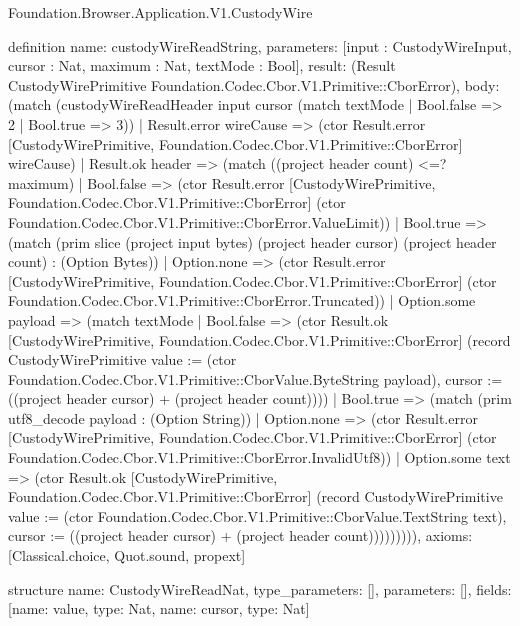 \begin{lexlean}{Foundation.Browser.Application.V1.CustodyWire}
\begin{semanticmodule}
definition{
  name: custodyWireReadString,
  parameters: [input : CustodyWireInput, cursor : Nat, maximum : Nat, textMode : Bool],
  result: (Result CustodyWirePrimitive Foundation.Codec.Cbor.V1.Primitive::CborError),
  body: (match (custodyWireReadHeader input cursor (match textMode
      | Bool.false => 2
      | Bool.true => 3))
    | Result.error wireCause => (ctor Result.error [CustodyWirePrimitive, Foundation.Codec.Cbor.V1.Primitive::CborError] wireCause)
    | Result.ok header => (match ((project header count) <=? maximum)
      | Bool.false => (ctor Result.error [CustodyWirePrimitive, Foundation.Codec.Cbor.V1.Primitive::CborError] (ctor Foundation.Codec.Cbor.V1.Primitive::CborError.ValueLimit))
      | Bool.true => (match (prim slice (project input bytes) (project header cursor) (project header count) : (Option Bytes))
        | Option.none => (ctor Result.error [CustodyWirePrimitive, Foundation.Codec.Cbor.V1.Primitive::CborError] (ctor Foundation.Codec.Cbor.V1.Primitive::CborError.Truncated))
        | Option.some payload => (match textMode
          | Bool.false => (ctor Result.ok [CustodyWirePrimitive, Foundation.Codec.Cbor.V1.Primitive::CborError] (record CustodyWirePrimitive {value := (ctor Foundation.Codec.Cbor.V1.Primitive::CborValue.ByteString payload), cursor := ((project header cursor) + (project header count))}))
          | Bool.true => (match (prim utf8_decode payload : (Option String))
            | Option.none => (ctor Result.error [CustodyWirePrimitive, Foundation.Codec.Cbor.V1.Primitive::CborError] (ctor Foundation.Codec.Cbor.V1.Primitive::CborError.InvalidUtf8))
            | Option.some text => (ctor Result.ok [CustodyWirePrimitive, Foundation.Codec.Cbor.V1.Primitive::CborError] (record CustodyWirePrimitive {value := (ctor Foundation.Codec.Cbor.V1.Primitive::CborValue.TextString text), cursor := ((project header cursor) + (project header count))}))))))),
  axioms: [Classical.choice, Quot.sound, propext]
}

structure{
  name: CustodyWireReadNat,
  type_parameters: [],
  parameters: [],
  fields: [{name: value, type: Nat}, {name: cursor, type: Nat}]
}


\end{semanticmodule}
\end{lexlean}
